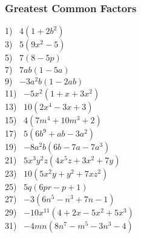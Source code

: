 \documentclass[12pt]{book}
\theoremstyle{definition}
\begin{document}
\subsubsection{Greatest Common Factors}


\begin{multicols}{3}
  1)~ $4(1+2b^2)$\\
  3)~ $5(9x^2-5)$\\
  5)~ $7(8-5p)$\\
  7)~ $7ab(1-5a)$\\
  9)~ $-3a^2b(1-2ab)$\\
  11)~ $-5x^2(1+x+3x^2)$\\
  13)~ $10(2x^4-3x+3)$\\
  15)~ $4(7m^4+10m^3+2)$\\
  17)~ $5(6b^9+ab-3a^2)$\\
  19)~ $-8a^2b(6b-7a-7a^3)$\\
  21)~ $5x^3y^2z(4x^5z+3x^2+7y)$\\
  23)~ $10(5x^2y+y^2+7xz^2)$\\
  25)~ $5q(6pr-p+1)$\\
  27)~ $-3(6n^5-n^3+7n-1)$\\
  29)~ $-10x^{11}(4+2x-5x^2+5x^3)$\\
  31)~ $-4mn(8n^7-m^5-3n^3-4)$%
\end{multicols}
\end{document}
